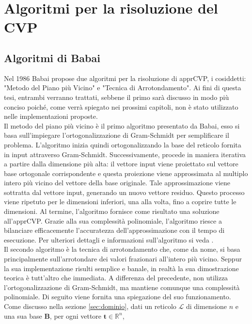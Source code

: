 \section{Algoritmi per la risoluzione del CVP}
\label{CVP}


\subsection{Algoritmi di Babai}
\label{sec:babai}
Nel 1986 Babai\cite{Babai86}  propose due algoritmi per la risoluzione di apprCVP, i cosiddetti:
"Metodo del Piano più Vicino" e "Tecnica di Arrotondamento". Ai fini di questa tesi, 
entrambi verranno trattati, sebbene il primo sarà discusso in modo più conciso 
poiché, come verrà spiegato nei prossimi capitoli, non è stato utilizzato nelle 
implementazioni proposte. \\
Il metodo del piano più vicino è il primo algoritmo presentato da Babai, esso si basa sull'impiegare 
l'ortogonalizzazione di Gram-Schmidt per semplificare il problema. L'algoritmo inizia quindi
ortogonalizzando la base del reticolo fornita in 
input attraverso Gram-Schmidt. Successivamente, procede in maniera iterativa a partire 
dalla dimensione più alta: il vettore input viene proiettato sul vettore base ortogonale 
corrispondente e questa proiezione viene approssimata al multiplo intero più vicino del 
vettore della base originale. Tale approssimazione viene sottratta dal vettore input, 
generando un nuovo vettore residuo. Questo processo viene ripetuto per le dimensioni 
inferiori, una alla volta, fino a coprire tutte le dimensioni. Al termine, l'algoritmo 
fornisce come risultato una soluzione all'apprCVP. 
Grazie alla sua complessità polinomiale, l'algoritmo riesce a bilanciare efficacemente 
l'accuratezza dell'approssimazione con il tempo di esecuzione. Per ulteriori dettagli e 
informazioni sull'algoritmo si veda \cite{Galbraith18}. 
\\
Il secondo algoritmo è la tecnica di arrotondamento che, come da nome, si basa
principalmente sull'arrotondare dei valori frazionari all'intero più vicino.
Seppur la sua implementazione risulti semplice e banale, in realtà la sua dimostrazione teorica
è tutt'altro che immediata. 
A differenza del precedente, 
non utilizza l'ortogonalizzazione di Gram-Schmidt, ma mantiene comunque una complessità 
polinomiale. Di seguito viene fornita una spiegazione del suo funzionamento. \\
Come discusso nella sezione \ref{sec:dominio}, dati un reticolo $\mathcal{L}$ di dimensione
$n$ e una sua base $\mathbf{B}$, per ogni vettore $\mathbf{t} \in \mathbb{R}^n$,
